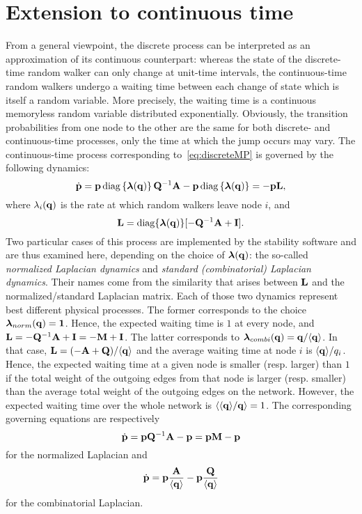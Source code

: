 \section{Extension to continuous time}

From a general viewpoint, the discrete process can be interpreted as an approximation of its continuous counterpart: whereas the state of the discrete-time random walker can only change at unit-time intervals, the continuous-time random walkers undergo a waiting time between each change of state which is itself a random variable. More precisely, the waiting time is a continuous memoryless random variable distributed exponentially. Obviously, the transition probabilities from one node to the other are the same for both discrete- and continuous-time processes, only the time at which the jump occurs may vary. The continuous-time process corresponding to~\eqref{eq:discreteMP} is governed by the following dynamics:
\begin{equation} \label{eq:continuousMP_general}
    	\dot{\mathbf p} = \mathbf p \operatorname{diag}\left\{\boldsymbol \lambda(\mathbf q)\right\} \mathbf Q^{-1} \mathbf A - \mathbf p \operatorname{diag}\left\{\boldsymbol \lambda(\mathbf q)\right\} = -\mathbf p \mathbf L,
\end{equation}
where $\lambda_i(\mathbf q)$ is the rate at which random walkers leave node $i$, and 
\begin{equation}
	\mathbf L = \operatorname{diag}\{\boldsymbol \lambda(\mathbf q)\}[-\mathbf Q^{-1} \mathbf A + \mathbf I].	
\end{equation}
Two particular cases of this process are implemented by the stability software and are thus examined here, depending on the choice of $\boldsymbol \lambda(\mathbf q)$: the so-called \textit{normalized Laplacian dynamics} and \textit{standard (combinatorial) Laplacian dynamics}. Their names come from the similarity that arises between $\mathbf L$ and the normalized/standard Laplacian matrix. Each of those two dynamics represent best different physical processes. The former corresponds to the choice $\boldsymbol \lambda_{norm}(\mathbf q) = \mathbf 1$. Hence, the expected waiting time is $1$ at every node, and $\mathbf L = -\mathbf Q^{-1} \mathbf A + \mathbf I = -\mathbf M + \mathbf I$. The latter corresponds to $\boldsymbol \lambda_{combi}(\mathbf q) = \mathbf q/\langle \mathbf q \rangle$. In that case, $\mathbf L = (-\mathbf A + \mathbf Q)/\langle \mathbf q \rangle$ and the average waiting time at node $i$ is $\langle \mathbf q \rangle/q_i$. Hence, the expected waiting time at a given node is smaller (resp. larger) than $1$ if the total weight of the outgoing edges from that node is larger (resp. smaller) than the average total weight of the outgoing edges on the network. However, the expected waiting time over the whole network is $\langle \langle \mathbf q \rangle/\mathbf q \rangle = 1$.\label{expectedtimebetweenjumps} The corresponding governing equations are respectively 
\begin{equation} \label{eq:continuousMP_norm}
	\dot{\mathbf p} = \mathbf p \mathbf Q^{-1} \mathbf A - \mathbf p = \mathbf p \mathbf M - \mathbf p
\end{equation}
for the normalized Laplacian and
\begin{equation} \label{eq:continuousMP_combi}
    	\dot{\mathbf p} = \mathbf p \frac{\mathbf A}{\langle \mathbf q \rangle} - \mathbf p\frac{\mathbf Q}{\langle \mathbf q \rangle}
\end{equation}
for the combinatorial Laplacian.

